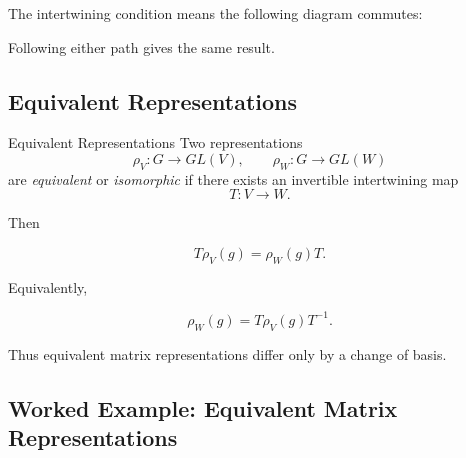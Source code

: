 The intertwining condition means the following diagram commutes:

\begin{center}
\end{center}

Following either path gives the same result.

\subsection{Equivalent Representations}
\label{subsec:equivalent-representations}

\begin{definitionbox}{Equivalent Representations}
Two representations
\[ \rho_V:G\to GL(V),\qquad \rho_W:G\to GL(W) \]
are \emph{equivalent} or \emph{isomorphic} if there exists an invertible
intertwining map
\[ T:V\to W. \]
\end{definitionbox}

Then

\[ T\rho_V(g)=\rho_W(g)T. \]

Equivalently,

\[ \rho_W(g)=T\rho_V(g)T^{-1}. \]

Thus equivalent matrix representations differ only by a change of basis.

\subsection{Worked Example: Equivalent Matrix Representations}
\label{subsec:worked-equivalent-representations}


